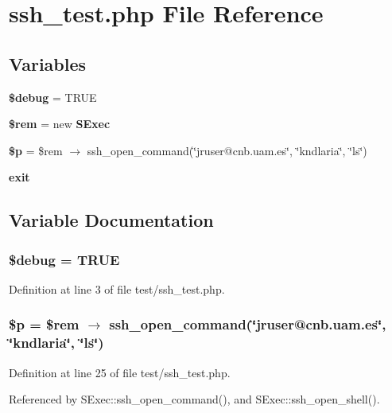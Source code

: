 \section{ssh\_\-test.php File Reference}
\label{test_2ssh__test_8php}
\subsection*{Variables}
\begin{CompactItemize}
\item 
{\bf \$debug} = TRUE
\item 
{\bf \$rem} = new {\bf SExec}
\item 
{\bf \$p} = \$rem $\rightarrow$ ssh\_\-open\_\-command(\char`\"{}jruser@cnb.uam.es\char`\"{}, \char`\"{}kndlaria\char`\"{}, \char`\"{}ls\char`\"{})
\item 
{\bf exit}
\end{CompactItemize}


\subsection{Variable Documentation}
\subsubsection{\setlength{\rightskip}{0pt plus 5cm}\$debug = TRUE}\label{test_2ssh__test_8php_a0}




Definition at line 3 of file test/ssh\_\-test.php.
\subsubsection{\setlength{\rightskip}{0pt plus 5cm}\$p = \$rem $\rightarrow$ ssh\_\-open\_\-command(\char`\"{}jruser@cnb.uam.es\char`\"{}, \char`\"{}kndlaria\char`\"{}, \char`\"{}ls\char`\"{})}\label{test_2ssh__test_8php_a2}




Definition at line 25 of file test/ssh\_\-test.php.

Referenced by SExec::ssh\_\-open\_\-command(), and SExec::ssh\_\-open\_\-shell().

